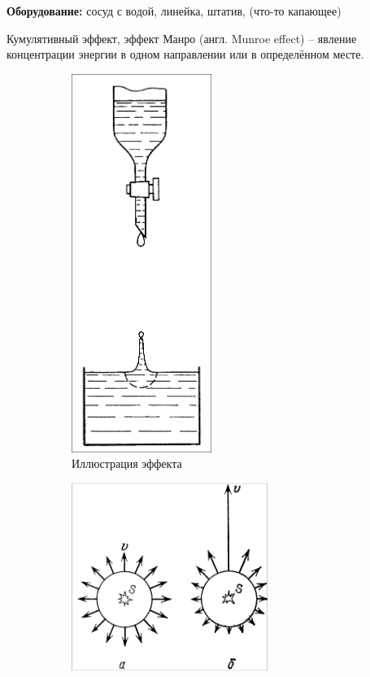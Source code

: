 \documentclass[a4paper, 12pt]{article}
\begin{document}
\noindent \textbf{Оборудование:}
сосуд с водой, линейка, штатив, (что-то капающее)

\bigskip

Кумулятивный эффект, эффект Манро (англ. Munroe effect) -- явление
концентрации энергии в одном направлении или в определённом месте.

\begin{figure}[H]
    \begin{subfigure}{0.3\textwidth}
        \centering
        \includegraphics[width=0.5\textwidth]{img/Experiment Scheme.png}
        \caption*{Иллюстрация эффекта}
    \end{subfigure}%
    \begin{subfigure}{0.5\textwidth}
        \centering
        \includegraphics[width=0.7\textwidth]{img/Cumulative effect.png}

\end{subfigure}
\end{figure}
\end{document}
